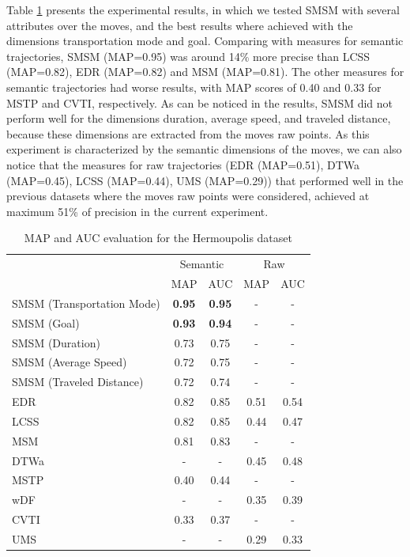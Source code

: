 Table \ref{tab:hermoupolis_measures_map_auc} presents the experimental results, in which we tested SMSM with several  attributes over the moves, and the best results where achieved with the dimensions transportation mode and goal. Comparing with measures for semantic trajectories, SMSM (MAP=0.95) was around 14\% more precise than LCSS (MAP=0.82), EDR (MAP=0.82) and MSM (MAP=0.81). The other measures for semantic trajectories had worse results, with MAP scores of 0.40 and 0.33 for MSTP and CVTI, respectively. As can be noticed in the results,  SMSM did not perform well for the dimensions duration, average speed, and traveled distance, because these dimensions are extracted from the moves raw points. As this experiment is characterized by the semantic dimensions of the moves, we can also notice that the measures for raw trajectories (EDR (MAP=0.51), DTWa (MAP=0.45), LCSS (MAP=0.44), UMS (MAP=0.29)) that performed well in the previous datasets where the moves raw points were considered, achieved at maximum 51\% of precision in the current experiment.


\begin{table}[h]
\scriptsize
  \centering
  \begin{tabular}{|l|c|c|c|c|}
  \hline
 & \multicolumn{2}{c}{Semantic} & \multicolumn{2}{|c|}{Raw} \\
 	\cline{2-5}
 & MAP & AUC & MAP & AUC \\
  \hline
SMSM (Transportation Mode)& \textbf{0.95} & \textbf{0.95} & - & -\\
SMSM (Goal)& \textbf{0.93} & \textbf{0.94} & - & -\\
SMSM (Duration)& 0.73 & 0.75 & - & -\\
SMSM (Average Speed)& 0.72 & 0.75 & - & -\\
SMSM (Traveled Distance)& 0.72 & 0.74 & - & -\\
EDR & 0.82 & 0.85 & 0.51 & 0.54 \\
LCSS & 0.82 & 0.85 & 0.44 & 0.47 \\
MSM & 0.81 & 0.83 & - & - \\
DTWa & - & - & 0.45 & 0.48 \\
MSTP & 0.40 & 0.44 & - & - \\
wDF & - & - & 0.35 & 0.39 \\
CVTI & 0.33 & 0.37 & - & - \\
UMS & - & - & 0.29 & 0.33 \\
    \hline
  \end{tabular}
  \caption{MAP and AUC evaluation for the Hermoupolis dataset}
  \label{tab:hermoupolis_measures_map_auc}
\end{table}

